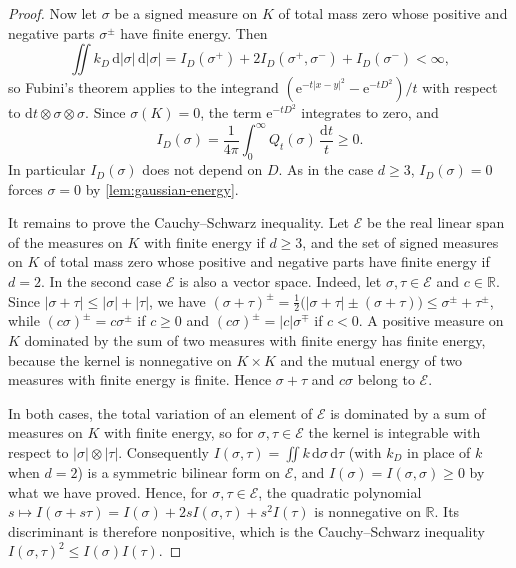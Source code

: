 \begin{proof}
Now let $\sigma$ be a signed measure on $K$ of total mass zero whose positive and negative parts $\sigma^\pm$ have finite energy. Then
\[
 \iint k_D\,\mathrm d|\sigma|\,\mathrm d|\sigma|=I_D(\sigma^+)+2I_D(\sigma^+,\sigma^-)+I_D(\sigma^-)<\infty,
\]
so Fubini's theorem applies to the integrand $(\mathrm e^{-t|x-y|^2}-\mathrm e^{-tD^2})/t$ with respect to $\mathrm dt\otimes\sigma\otimes\sigma$. Since $\sigma(K)=0$, the term $\mathrm e^{-tD^2}$ integrates to zero, and
\[
 I_D(\sigma)=\frac1{4\pi}\int_0^\infty Q_t(\sigma)\,\frac{\mathrm d t}{t}\geq0.
\]
In particular $I_D(\sigma)$ does not depend on $D$. As in the case $d\geq3$, $I_D(\sigma)=0$ forces $\sigma=0$ by \cref{lem:gaussian-energy}.

It remains to prove the Cauchy--Schwarz inequality. Let $\mathcal E$ be the real linear span of the measures on $K$ with finite energy if $d\geq3$, and the set of signed measures on $K$ of total mass zero whose positive and negative parts have finite energy if $d=2$. In the second case $\mathcal E$ is also a vector space. Indeed, let $\sigma,\tau\in\mathcal E$ and $c\in\mathbb R$. Since $|\sigma+\tau|\leq|\sigma|+|\tau|$, we have $(\sigma+\tau)^\pm=\frac12\bigl(|\sigma+\tau|\pm(\sigma+\tau)\bigr)\leq\sigma^\pm+\tau^\pm$, while $(c\sigma)^\pm=c\sigma^\pm$ if $c\geq0$ and $(c\sigma)^\pm=|c|\sigma^\mp$ if $c<0$. A positive measure on $K$ dominated by the sum of two measures with finite energy has finite energy, because the kernel is nonnegative on $K\times K$ and the mutual energy of two measures with finite energy is finite. Hence $\sigma+\tau$ and $c\sigma$ belong to $\mathcal E$.

In both cases, the total variation of an element of $\mathcal E$ is dominated by a sum of measures on $K$ with finite energy, so for $\sigma,\tau\in\mathcal E$ the kernel is integrable with respect to $|\sigma|\otimes|\tau|$. Consequently $I(\sigma,\tau)=\iint k\,\mathrm d\sigma\,\mathrm d\tau$ (with $k_D$ in place of $k$ when $d=2$) is a symmetric bilinear form on $\mathcal E$, and $I(\sigma)=I(\sigma,\sigma)\geq0$ by what we have proved. Hence, for $\sigma,\tau\in\mathcal E$, the quadratic polynomial $s\mapsto I(\sigma+s\tau)=I(\sigma)+2sI(\sigma,\tau)+s^2I(\tau)$ is nonnegative on $\mathbb R$. Its discriminant is therefore nonpositive, which is the Cauchy--Schwarz inequality $I(\sigma,\tau)^2\leq I(\sigma)I(\tau)$.
\end{proof}

